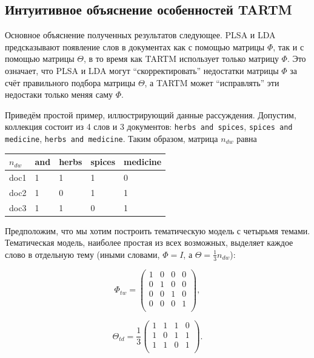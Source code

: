 \subsection{Интуитивное объяснение особенностей TARTM}

Основное объяснение полученных результатов следующее. PLSA и LDA предсказывают появление слов в документах как с помощью матрицы $\Phi$, так и с помощью матрицы $\Theta$, в то время как TARTM использует только матрицу $\Phi$. Это означает, что PLSA и LDA могут ``скорректировать'' недостатки матрицы $\Phi$ за счёт правильного подбора матрицы $\Theta$, а TARTM может ``исправлять'' эти недостаки только меняя саму $\Phi$.

Приведём простой пример, иллюстрирующий данные рассуждения. Допустим, коллекция состоит из 4 слов и 3 документов: \texttt{herbs and spices}, \texttt{spices and medicine}, \texttt{herbs and medicine}. Таким образом, матрица $n_{dw}$ равна

\begin{center}
\begin{tabular}{l|llll}
$n_{dw}$   & and & herbs & spices & medicine \\ \hline
doc1       & 1   & 1     & 1      & 0        \\
doc2       & 1   & 0     & 1      & 1        \\
doc3       & 1   & 1     & 0      & 1       
\end{tabular}
\end{center}

Предположим, что мы хотим построить тематическую модель с четырьмя темами. Тематическая модель, наиболее простая из всех возможных, выделяет каждое слово в отдельную тему (иными словами, $\Phi = I$, а $\Theta = \frac{1}{3} n_{dw}$):
\begin{minipage}[t]{0.25\textwidth}
\[
\Phi_{tw} = 
\begin{pmatrix}
    1 & 0 & 0 & 0 \\
    0 & 1 & 0 & 0 \\
    0 & 0 & 1 & 0 \\
    0 & 0 & 0 & 1 \\
\end{pmatrix},
\]
\end{minipage}\begin{minipage}[t]{0.2\textwidth}
\[
\Theta_{td} = \frac{1}{3} 
\begin{pmatrix}
    1 & 1 & 1 & 0 \\
    1 & 0 & 1 & 1 \\
    1 & 1 & 0 & 1 \\
\end{pmatrix}.
\]
\end{minipage}

